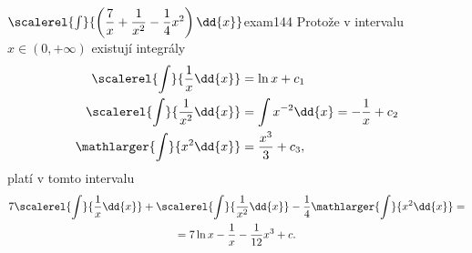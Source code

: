 \begin{mathexam}{\(\scalerel{\int}{\left(\dfrac{7}{x}+ \dfrac{1}{x^2} -
    \dfrac{1}{4}x^2\right)\dd{x}}\)}{exam144} 
    Protože v intervalu \(x\in(0, +\infty)\) existují integrály
    \begin{align*}
      \scalerel{\int}{\dfrac{1}{x}\dd{x}}   &= \ln x + c_1  \\
      \scalerel{\int}{\dfrac{1}{x^2}\dd{x}} &= \int x^{-2}\dd{x} = -\dfrac{1}{x} + c_2  \\
      \mathlarger{\int}{x^2\dd{x}}            &= \dfrac{x^3}{3} + c_3 ,
    \end{align*}  
    platí v tomto intervalu
    \begin{multline*}
                    7\scalerel{\int}{\dfrac{1}{x}\dd{x}}   + 
                     \scalerel{\int}{\dfrac{1}{x^2}\dd{x}} - 
       \dfrac{1}{4}\mathlarger{\int}{x^2\dd{x}} =                   \\
         = 7\ln x - \dfrac{1}{x} - \dfrac{1}{12}x^3 + c.
    \end{multline*}
\end{mathexam}